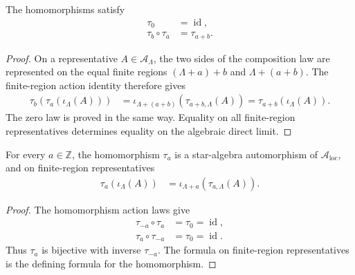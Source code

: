 \begin{lemma}
    \label{lem:qca_algebraic_local_translation_hom_action}
    \leanok
    The homomorphisms satisfy
    \begin{align}
        \tau_0            & =\operatorname{id}, \\
        \tau_b\circ\tau_a & =\tau_{a+b}.
    \end{align}
\end{lemma}

\begin{proof}\leanok
    On a representative $A\in\mathcal A_\Lambda$, the two sides of the
    composition law are represented on the equal finite regions
    $(\Lambda+a)+b$ and $\Lambda+(a+b)$. The finite-region action identity
    therefore gives
    \begin{align}
        \tau_b(\tau_a(\iota_\Lambda(A)))
         & =\iota_{\Lambda+(a+b)}
        (\tau_{a+b,\Lambda}(A))
        =\tau_{a+b}(\iota_\Lambda(A)).
    \end{align}
    The zero law is proved in the same way. Equality on all finite-region
    representatives determines equality on the algebraic direct limit.
\end{proof}

\begin{definition}
    \label{def:qca_algebraic_local_translation}
    \leanok
    For every $a\in\mathbb Z$, the homomorphism $\tau_a$ is a star-algebra
    automorphism of $\mathcal A_{\mathrm{loc}}$, and on finite-region
    representatives
    \begin{align}
        \tau_a(\iota_\Lambda(A))
         & =\iota_{\Lambda+a}(\tau_{a,\Lambda}(A)).
    \end{align}
\end{definition}

\begin{proof}\leanok
    The homomorphism action laws give
    \begin{align}
        \tau_{-a}\circ\tau_a & =\tau_0=\operatorname{id}, \\
        \tau_a\circ\tau_{-a} & =\tau_0=\operatorname{id}.
    \end{align}
    Thus $\tau_a$ is bijective with inverse $\tau_{-a}$. The formula on
    finite-region representatives is the defining formula for the homomorphism.
\end{proof}

